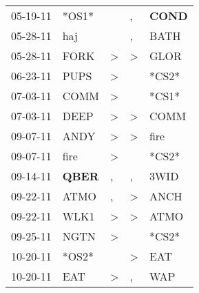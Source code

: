 \begin{supertabular}{p{0.07\textwidth}p{0.06\textwidth}p{0.02\textwidth}p{0.02\textwidth}p{0.06\textwidth}}
          05-19-11\textsuperscript{} &                            *OS1* &                  &                , &  \textbf{COND\textsuperscript{}} \\
          05-28-11\textsuperscript{} &            haj\textsuperscript{} &                  &                , &           BATH\textsuperscript{} \\
          05-28-11\textsuperscript{} &           FORK\textsuperscript{} &     \textgreater &     \textgreater &           GLOR\textsuperscript{} \\
          06-23-11\textsuperscript{} &           PUPS\textsuperscript{} &     \textgreater &                  &                            *CS2* \\
          07-03-11\textsuperscript{} &           COMM\textsuperscript{} &     \textgreater &                  &                            *CS1* \\
          07-03-11\textsuperscript{} &           DEEP\textsuperscript{} &     \textgreater &     \textgreater &           COMM\textsuperscript{} \\
          09-07-11\textsuperscript{} &           ANDY\textsuperscript{} &     \textgreater &     \textgreater &           fire\textsuperscript{} \\
          09-07-11\textsuperscript{} &           fire\textsuperscript{} &     \textgreater &                  &                            *CS2* \\
          09-14-11\textsuperscript{} &  \textbf{QBER\textsuperscript{}} &                , &                , &           3WID\textsuperscript{} \\
          09-22-11\textsuperscript{} &           ATMO\textsuperscript{} &                , &     \textgreater &           ANCH\textsuperscript{} \\
          09-22-11\textsuperscript{} &           WLK1\textsuperscript{} &     \textgreater &     \textgreater &           ATMO\textsuperscript{} \\
          09-25-11\textsuperscript{} &           NGTN\textsuperscript{} &     \textgreater &                  &                            *CS2* \\
          10-20-11\textsuperscript{} &                            *OS2* &                  &     \textgreater &            EAT\textsuperscript{} \\
          10-20-11\textsuperscript{} &            EAT\textsuperscript{} &     \textgreater &                , &            WAP\textsuperscript{} \\

\end{supertabular}
